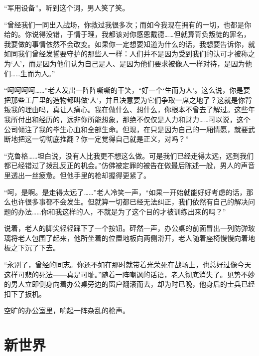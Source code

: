 \documentclass[openany,a4paper]{ctexbook}
\begin{document}
“军用设备”。听到这个词，男人笑了笑。

“曾经我们一同出入战场，你救过我很多次；而如今我现在拥有的一切，也都是你给的。你说得没错，于情于理，我都该对你感恩戴德……但就算背负叛徒的罪名，我要做的事情依然不会改变。如果你一定想要知道为什么的话，我想要告诉你，就如同我们曾经发誓要守护的那些人一样：人们并不是因为受到我们的认可才被称之为‘人’，而是因为他们认为自己是人、是因为他们要求被像人一样对待，是因为他们……生而为人。”

“呵呵呵呵……”老人发出一阵阵嘶嘶的干笑，“好一个‘生而为人’。这么说，你是要把那些工厂里的造物都叫做‘人’，并且决意要为它们争取一席之地了？这就是你背叛我的理由吗，真让人痛心。我在做什么、想什么，你根本不曾去了解过。这些年我所付出和经历的，远非你所能想象，那绝不仅仅是人力和财力……可以说，这个公司倾注了我的毕生心血和全部生命。但现，在只是因为自己的一厢情愿，就要武断地把这一切彻底推翻？你一定觉得自己就是正义，对吗？”

“克鲁格……坦白说，没有人比我更不想这么做。可是我们已经走得太远，远到我们都已经错过了拨乱反正的机会。”仿佛被定罪的被告在做最后陈述一般，男人的声音里透出一丝疲惫。但他手里的枪却握得更紧了。

“呵，是啊。是走得太远了……”老人冷笑一声，“如果一开始就能好好考虑的话，那么也许很多事都不会发生。但就算一切都已经无法纠正，我们依然有自己的解决问题的办法……你和我这样的人，不就是为了这个目的才被训练出来的吗？”

说着，老人的脚尖轻轻踩下了一个按钮。砰然一声，办公桌的前面冒出一列防弹玻璃将老人包围了起来，他所坐着的位置地板向两侧滑开，老人随着座椅慢慢向着地板之下沉了下去。

“永别了，曾经的同志。你还不如在那时就带着光荣死在战场上，也总好过像今天这样可悲的死法——真是可耻。”随着一阵嘲讽的话语，老人彻底消失了。见势不妙的男人立即侧身向着办公桌旁边的窗户翻滚而去，却为时已晚，他身后的士兵已经扣下了扳机。

空旷的办公室里，响起一阵杂乱的枪声。
\part{新世界}

























































\end{document}
